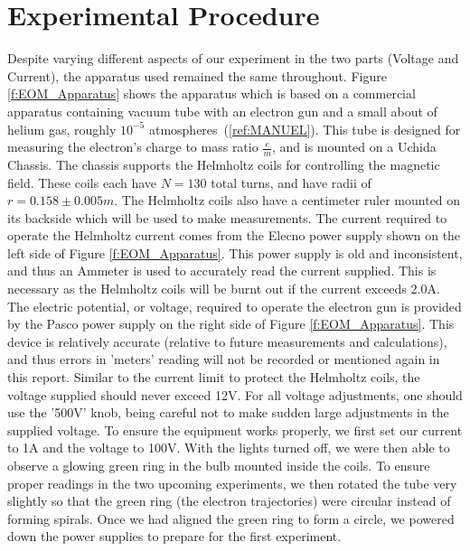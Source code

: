 \documentclass[12pt]{article}
\begin{document}
\section{Experimental Procedure}
Despite varying different aspects of our experiment in the two parts (Voltage and Current), the apparatus used remained the same throughout. Figure \ref{f:EOM_Apparatus} shows the apparatus which is based on a commercial apparatus containing vacuum tube with an electron gun and a small about of helium gas, roughly $10^{-5}$ atmospheres~(\ref{ref:MANUEL}). This tube is designed for measuring the electron's charge to mass ratio $\frac{e}{m}$, and is mounted on a Uchida Chassis. The chassis supports the Helmholtz coils for controlling the magnetic field. These coils each have $N=130$ total turns, and have radii of $r=0.158\pm0.005m$. The Helmholtz coils also have a centimeter ruler mounted on its backside which will be used to make measurements. The current required to operate the Helmholtz current comes from the Elecno power supply shown on the left side of Figure \ref{f:EOM_Apparatus}. This power supply is old and inconsistent, and thus an Ammeter is used to accurately read the current supplied. This is necessary as the Helmholtz coils will be burnt out if the current exceeds 2.0A. The electric potential, or voltage, required to operate the electron gun is provided by the Pasco power supply on the right side of Figure \ref{f:EOM_Apparatus}. This device is relatively accurate (relative to future measurements and calculations), and thus errors in 'meters' reading will not be recorded or mentioned again in this report. Similar to the current limit to protect the Helmholtz coils, the voltage supplied should never exceed 12V. For all voltage adjustments, one should use the '500V' knob, being careful not to make sudden large adjustments in the supplied voltage. To ensure the equipment works properly, we first set our current to 1A and the voltage to 100V. With the lights turned off, we were then able to observe a glowing green ring in the bulb mounted inside the coils. To ensure proper readings in the two upcoming experiments, we then rotated the tube very slightly so that the green ring (the electron trajectories) were circular instead of forming spirals. Once we had aligned the green ring to form a circle, we powered down the power supplies to prepare for the first experiment.
\end{document}
